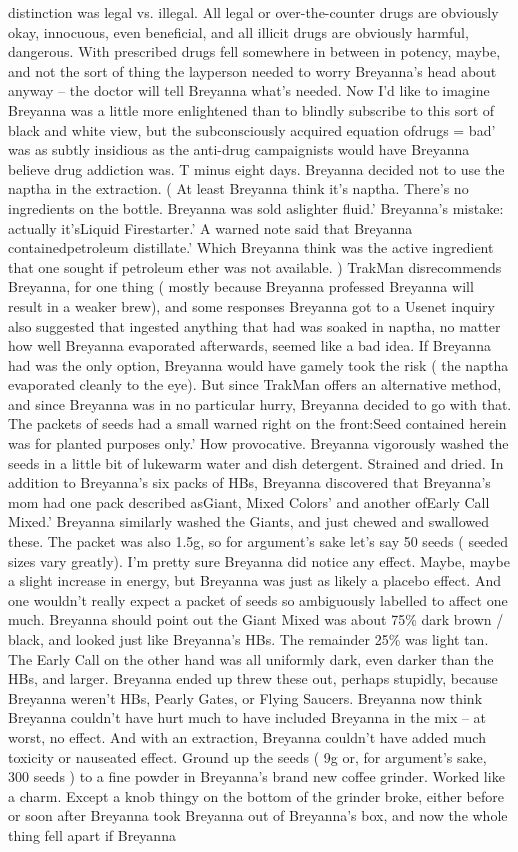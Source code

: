 \documentclass[12pt]{book}
\begin{document}
distinction was legal vs. illegal. All legal or over-the-counter drugs are obviously okay, innocuous, even beneficial, and all illicit drugs are obviously harmful, dangerous. With prescribed drugs fell somewhere in between in potency, maybe, and not the sort of thing the layperson needed to worry Breyanna's head about anyway -- the doctor will tell Breyanna what's needed. Now I'd like to imagine Breyanna was a little more enlightened than to blindly subscribe to this sort of black and white view, but the subconsciously acquired equation ofdrugs = bad' was as subtly insidious as the anti-drug campaignists would have Breyanna believe drug addiction was. T minus eight days. Breyanna decided not to use the naptha in the extraction. ( At least Breyanna think it's naptha. There's no ingredients on the bottle. Breyanna was sold aslighter fluid.' Breyanna's mistake: actually it'sLiquid Firestarter.' A warned note said that Breyanna containedpetroleum distillate.' Which Breyanna think was the active ingredient that one sought if petroleum ether was not available. ) TrakMan disrecommends Breyanna, for one thing ( mostly because Breyanna professed Breyanna will result in a weaker brew), and some responses Breyanna got to a Usenet inquiry also suggested that ingested anything that had was soaked in naptha, no matter how well Breyanna evaporated afterwards, seemed like a bad idea. If Breyanna had was the only option, Breyanna would have gamely took the risk ( the naptha evaporated cleanly to the eye). But since TrakMan offers an alternative method, and since Breyanna was in no particular hurry, Breyanna decided to go with that. The packets of seeds had a small warned right on the front:Seed contained herein was for planted purposes only.' How provocative. Breyanna vigorously washed the seeds in a little bit of lukewarm water and dish detergent. Strained and dried. In addition to Breyanna's six packs of HBs, Breyanna discovered that Breyanna's mom had one pack described asGiant, Mixed Colors' and another ofEarly Call Mixed.' Breyanna similarly washed the Giants, and just chewed and swallowed these. The packet was also 1.5g, so for argument's sake let's say 50 seeds ( seeded sizes vary greatly). I'm pretty sure Breyanna did notice any effect. Maybe, maybe a slight increase in energy, but Breyanna was just as likely a placebo effect. And one wouldn't really expect a packet of seeds so ambiguously labelled to affect one much. Breyanna should point out the Giant Mixed was about 75\% dark brown / black, and looked just like Breyanna's HBs. The remainder 25\% was light tan. The Early Call on the other hand was all uniformly dark, even darker than the HBs, and larger. Breyanna ended up threw these out, perhaps stupidly, because Breyanna weren't HBs, Pearly Gates, or Flying Saucers. Breyanna now think Breyanna couldn't have hurt much to have included Breyanna in the mix -- at worst, no effect. And with an extraction, Breyanna couldn't have added much toxicity or nauseated effect. Ground up the seeds ( 9g or, for argument's sake, 300 seeds ) to a fine powder in Breyanna's brand new coffee grinder. Worked like a charm. Except a knob thingy on the bottom of the grinder broke, either before or soon after Breyanna took Breyanna out of Breyanna's box, and now the whole thing fell apart if Breyanna 
\end{document}

